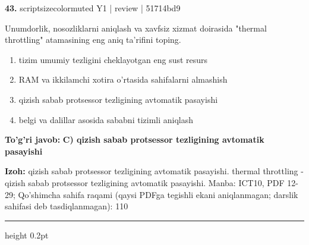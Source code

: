 \documentclass[10pt,a4paper]{article}
\begin{document}
{\bfseries\sffamily\color{ink} 43.} {scriptsizecolor{muted} Y1 | review | 51714bd9}
\par
Unumdorlik, nosozliklarni aniqlash va xavfsiz xizmat doirasida "thermal throttling" atamasining eng aniq ta'rifini toping.
\begin{enumerate}[label=\Alph*),leftmargin=9mm]
\item tizim umumiy tezligini cheklayotgan eng sust resurs
\item RAM va ikkilamchi xotira o'rtasida sahifalarni almashish
\item qizish sabab protsessor tezligining avtomatik pasayishi
\item belgi va dalillar asosida sababni tizimli aniqlash
\end{enumerate}
\begin{tcolorbox}[enhanced,breakable,colback=teal!4,colframe=teal!60!black,boxrule=0.45pt,arc=1.2mm,left=2.7mm,right=2.7mm,top=1.8mm,bottom=1.8mm,before skip=2mm,after skip=2mm]
{\bfseries\sffamily\color{teal}To'g'ri javob:} \textbf{C) qizish sabab protsessor tezligining avtomatik pasayishi}
\par\smallskip
{\bfseries Izoh:} qizish sabab protsessor tezligining avtomatik pasayishi. thermal throttling - qizish sabab protsessor tezligining avtomatik pasayishi. Manba: ICT10, PDF 12-29; Qo'shimcha sahifa raqami (qaysi PDFga tegishli ekani aniqlanmagan; darslik sahifasi deb tasdiqlanmagan): 110
\end{tcolorbox}
\vspace{2mm}\hrule height 0.2pt\vspace{3mm}
\end{document}
